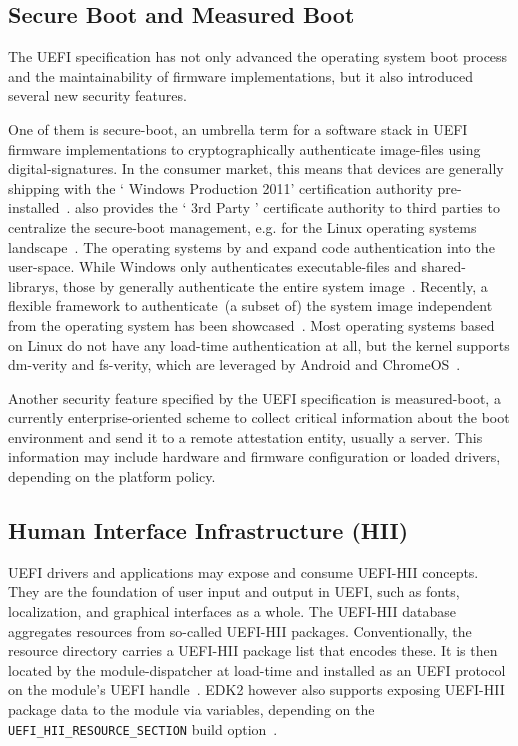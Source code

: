 \subsection{Secure Boot and Measured Boot}
\label{sec:sb_mb}

The \gls{UEFI} specification has not only advanced the operating system boot process and the maintainability of \gls{firmware} implementations, but it also introduced several new security features.

One of them is \gls{secure-boot}, an umbrella term for a software stack in \gls{UEFI} \gls{firmware} implementations to cryptographically authenticate \glspl{image-file} using \glspl{digital-signature}. In the consumer market, this means that devices are generally shipping with the ` Windows Production  2011' certification authority pre-installed~\cite{ms-sbkey}.  also provides the ` 3rd Party  ' certificate authority to third parties to centralize the \gls{secure-boot} management, e.g. for the Linux operating systems landscape~\cite{ms-sbkey3rd}. The operating systems by  and  expand code authentication into the \gls{user-space}. While Windows only authenticates \glspl{executable-file} and \glspl{shared-library}, those by  generally authenticate the entire system image~\cite{apple-sec}. Recently, a flexible framework to authenticate~(a subset of) the system image independent from the operating system has been showcased~\cite{amaranth}. Most operating systems based on Linux do not have any load-time authentication at all, but the kernel supports dm-verity and fs-verity, which are leveraged by Android and ChromeOS~\cite{linux}.

Another security feature specified by the \gls{UEFI} specification is \gls{measured-boot}, a currently enterprise-oriented scheme to collect critical information about the boot environment and send it to a remote attestation entity, usually a server. This information may include hardware and \gls{firmware} configuration or loaded drivers, depending on the platform policy.

\subsection{Human Interface Infrastructure (HII)}

\gls{UEFI} drivers and applications may expose and consume \gls{UEFI-HII} concepts. They are the foundation of user input and output in \gls{UEFI}, such as fonts, localization, and graphical interfaces as a whole. The \gls{UEFI-HII} database aggregates resources from so-called \gls{UEFI-HII} packages. Conventionally, the  resource directory carries a \gls{UEFI-HII} package list that encodes these. It is then located by the \gls{module-dispatcher} at load-time and installed as an \gls{UEFI} protocol on the module's \gls{UEFI} handle~\cite{uefi-spec}. \gls{EDK2} however also supports exposing \gls{UEFI-HII} package data to the module via  variables, depending on the \lstinline{UEFI_HII_RESOURCE_SECTION} build option~\cite{edk2-module-writers,edk2}.

